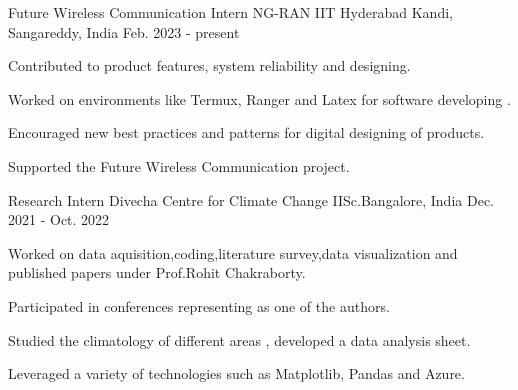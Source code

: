 \documentclass[11pt, a4paper]{russell}
\begin{document}
\begin{cventries}

  \cventry
  {\small Future Wireless Communication Intern} %
  {\normalsize NG-RAN IIT Hyderabad} %
  {\small Kandi, Sangareddy, India} %
  {\small Feb. 2023 - present} %
    {
      \begin{cvitems} %
      \item \small Contributed to product features, system reliability and designing. 
      \item \small Worked on environments like Termux, Ranger and Latex  for software developing . 
      \item \small Encouraged new best practices and patterns for digital designing of products.
      \item \small Supported the Future Wireless Communication project.
      \end{cvitems}
    }

\vspace{3mm}
  \cventry
  {\small Research Intern} %
  {\normalsize Divecha Centre for Climate Change} %
  {\small IISc.Bangalore, India} %
  {\small Dec. 2021 - Oct. 2022 } %
    {
      \begin{cvitems} %
      \item \small Worked on data aquisition,coding,literature survey,data visualization and published papers under Prof.Rohit Chakraborty.
      \item \small Participated in conferences representing as one of the authors.
      \item \small Studied the climatology of different areas , developed a data analysis sheet.
      \item \small Leveraged a variety of technologies such as Matplotlib, Pandas and  Azure.
      \end{cvitems}
    }


\end{cventries}
\end{document}
